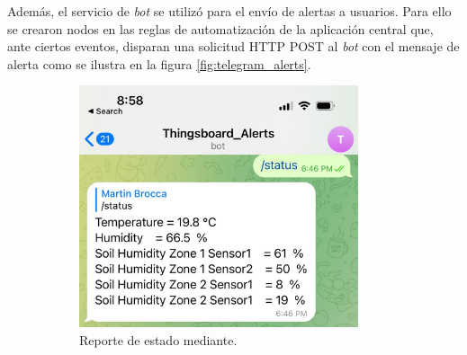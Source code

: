 Además, el servicio de \textit{bot} se utilizó para el envío de alertas a  usuarios. Para ello se crearon nodos en las reglas de automatización de la aplicación central que, ante ciertos eventos, disparan una solicitud HTTP POST al \textit{bot} con el mensaje de alerta como se ilustra en la figura \ref{fig:telegram_alerts}.



\begin{figure}[!htpb]
     \centering
     \begin{subfigure}[b]{0.45\textwidth}
	    \centering
	    \includegraphics[width=0.9\textwidth]{./Figures/Telegram_Status.jpg}
	     \caption[Reporte de estado mediante]{Reporte de estado mediante.}
	     \label{fig:telegram_status}
     \end{subfigure}
     \hfill
     \begin{subfigure}[b]{0.45\textwidth}
	\centering

\end{subfigure}
\end{figure}
